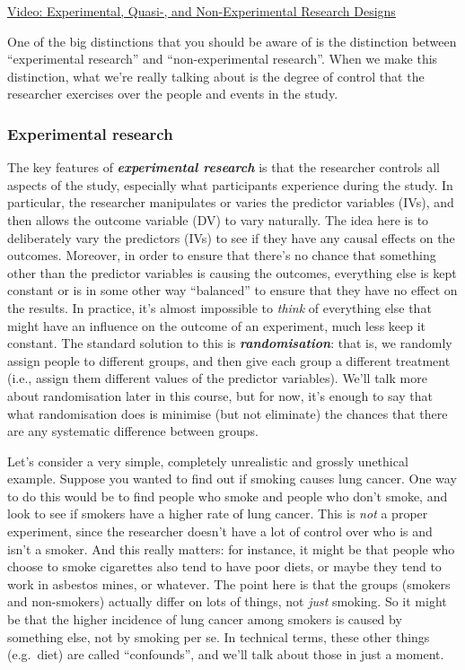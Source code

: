 \documentclass[
]{book}
\begin{document}
\href{https://youtu.be/H9uDTWD8R4M}{Video: Experimental, Quasi-, and Non-Experimental Research Designs}

One of the big distinctions that you should be aware of is the distinction between ``experimental research'' and ``non-experimental research''. When we make this distinction, what we're really talking about is the degree of control that the researcher exercises over the people and events in the study.

\hypertarget{experimental-research}{%
\subsubsection{Experimental research}\label{experimental-research}}

The key features of \textbf{\emph{experimental research}} is that the researcher controls all aspects of the study, especially what participants experience during the study. In particular, the researcher manipulates or varies the predictor variables (IVs), and then allows the outcome variable (DV) to vary naturally. The idea here is to deliberately vary the predictors (IVs) to see if they have any causal effects on the outcomes. Moreover, in order to ensure that there's no chance that something other than the predictor variables is causing the outcomes, everything else is kept constant or is in some other way ``balanced'' to ensure that they have no effect on the results. In practice, it's almost impossible to \emph{think} of everything else that might have an influence on the outcome of an experiment, much less keep it constant. The standard solution to this is \textbf{\emph{randomisation}}: that is, we randomly assign people to different groups, and then give each group a different treatment (i.e., assign them different values of the predictor variables). We'll talk more about randomisation later in this course, but for now, it's enough to say that what randomisation does is minimise (but not eliminate) the chances that there are any systematic difference between groups.

Let's consider a very simple, completely unrealistic and grossly unethical example. Suppose you wanted to find out if smoking causes lung cancer. One way to do this would be to find people who smoke and people who don't smoke, and look to see if smokers have a higher rate of lung cancer. This is \emph{not} a proper experiment, since the researcher doesn't have a lot of control over who is and isn't a smoker. And this really matters: for instance, it might be that people who choose to smoke cigarettes also tend to have poor diets, or maybe they tend to work in asbestos mines, or whatever. The point here is that the groups (smokers and non-smokers) actually differ on lots of things, not \emph{just} smoking. So it might be that the higher incidence of lung cancer among smokers is caused by something else, not by smoking per se. In technical terms, these other things (e.g.~diet) are called ``confounds'', and we'll talk about those in just a moment.
\end{document}
